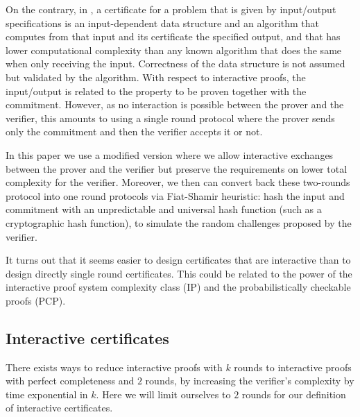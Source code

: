 \documentclass{article}
\begin{document}
On the contrary, in \cite{KLYZ09,Kaltofen:2011:quadcert}, a certificate for a
problem that is given by input/output specifications is an input-dependent data
structure and an algorithm that computes from that input and its certificate the
specified output, and that has lower computational complexity than any known
algorithm that does the same when only receiving the input. Correctness of the
data structure is not assumed but validated by the algorithm. 
With respect to interactive proofs, the input/output is related to the property
to be proven together with the commitment.
However, as no interaction is possible between the prover and the verifier, this
amounts to using a single round protocol where the prover sends only the
commitment and then the verifier accepts it or not. 

In this paper we use a modified version where we allow interactive exchanges
between the prover and the verifier but preserve the requirements on lower total
complexity for the verifier.
Moreover, we then can convert back these two-rounds protocol into one round
protocols via Fiat-Shamir heuristic: hash the input and commitment with an
unpredictable and universal hash function  (such as a cryptographic hash
function), to simulate the random challenges proposed by the verifier. 

It turns out that it seems easier to design certificates that are interactive
than to design directly single round certificates. This could be related to the
power of the interactive proof system complexity class (IP) and the
probabilistically checkable proofs (PCP).

\subsection{Interactive certificates}\label{ssec:intcert}
 
There exists ways to reduce interactive proofs with $k$ rounds to interactive
proofs with perfect completeness and $2$ rounds,
by increasing the verifier's complexity by time exponential in $k$.
Here we will limit ourselves to $2$ rounds
for our definition of interactive certificates. 
\end{document}
